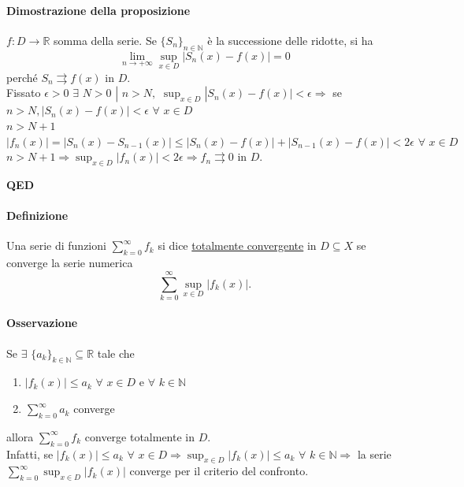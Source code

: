 \documentclass{article}
\newcommand{\R}{\mathbb{R}}
\newcommand{\N}{\mathbb{N}}
\begin{document}
\paragraph{{Dimostrazione della proposizione}}
$f:D \rightarrow \R$ somma della serie. Se $\{S_n\}_{n \in \N}$ è la successione delle ridotte, si ha 
\begin{equation*}
    \lim_{n \rightarrow + \infty} \sup_{x \in D} |S_n(x)-f(x)|=0
\end{equation*}
perché $S_n \rightrightarrows f(x)$ in $D$.\\
Fissato $\epsilon >0 \,\, \exists\,\, N >0\,\, |\,\, n > N,\,\,\sup_{x \in D} |S_n(x)-f(x)|< \epsilon \Rightarrow$ se $n > N, |S_n(x)-f(x)|< \epsilon \,\, \forall \,\, x \in D$\\
$n > N +1$\\
$|f_n(x)|=|S_n(x)-S_{n-1}(x)|\leq |S_n (x)-f(x)|+|S_{n-1}(x)-f(x)| < 2 \epsilon \,\, \forall \,\, x \in D$\\
$n > N+1 \Rightarrow \sup_{x \in D}|f_n(x)| < 2 \epsilon \Rightarrow f_n \rightrightarrows 0$ in $D$.
\begin{flushright}
\textbf{QED}
\end{flushright}

\paragraph{{Definizione}}
Una serie di funzioni $\sum_{k=0}^{\infty}f_k$ si dice \underline{totalmente convergente} in $D \subseteq X$ se converge la serie numerica 
\begin{equation*}
    \sum_{k=0}^{\infty}\sup_{x\in D}|f_k(x)|.
\end{equation*}

\paragraph{{Osservazione}}
Se $\exists\,\, \{a_k\}_{k \in \N}\subseteq \R$ tale che 
\begin{enumerate}
    \item $|f_k(x)|\leq a_k \,\, \forall \,\, x \in D$ e $\forall\,\, k \in \N $
    \item $\sum_{k=0}^{\infty}a_k$ converge 
\end{enumerate}
allora $\sum_{k=0}^{\infty}f_k$ converge totalmente in $D$.\\
Infatti, se $|f_k(x)|\leq a_k \,\,\forall \,\,x \in D \Rightarrow \sup_{x \in D} |f_k (x)|\leq a_k \,\,\forall\,\, k \in \N \Rightarrow$ la serie $\sum_{k=0}^{\infty} \sup_{x \in D}|f_k(x)|$ converge per il criterio del confronto.
\end{document}
